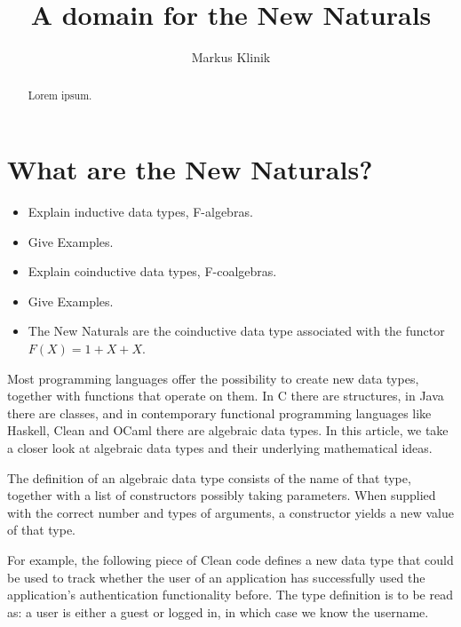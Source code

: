 \documentclass[a4paper]{article}
\begin{document}
\title{A domain for the New Naturals}
\author{Markus Klinik}
\maketitle

\begin{abstract}
Lorem ipsum.
\end{abstract}

\section{What are the New Naturals?}


\begin{itemize}
\item Explain inductive data types, F-algebras.
\item Give Examples.
\item Explain coinductive data types, F-coalgebras.
\item Give Examples.
\item The New Naturals are the coinductive data type associated with the
functor $F(X) = 1 + X + X$.
\end{itemize}


Most programming languages offer the possibility to create new data types,
together with functions that operate on them.  In C there are structures, in
Java there are classes, and in contemporary functional programming languages
like Haskell, Clean and OCaml there are algebraic data types.  In this article,
we take a closer look at algebraic data types and their underlying mathematical
ideas.


The definition of an algebraic data type consists of the name of that type,
together with a list of constructors possibly taking parameters.  When supplied
with the correct number and types of arguments, a constructor yields a new
value of that type.

For example, the following piece of Clean code defines a new data type that
could be used to track whether the user of an application has successfully used
the application's authentication functionality before.  The type definition is
to be read as: a user is either a guest or logged in, in which case we know the
username.
\end{document}
